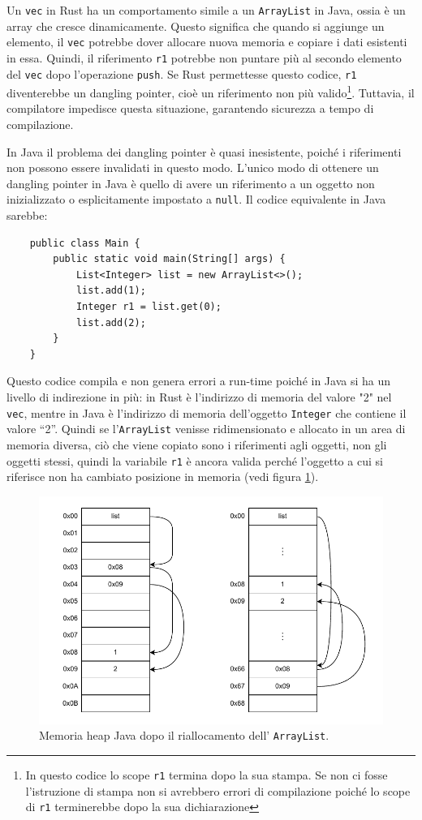 Un \texttt{vec} in Rust ha un comportamento simile a un \texttt{ArrayList} in Java, ossia è un array che cresce dinamicamente. Questo significa che quando si aggiunge un elemento, il \texttt{vec} potrebbe dover allocare nuova memoria e copiare i dati esistenti in essa. Quindi, il riferimento \texttt{r1} potrebbe non puntare più al secondo elemento del \texttt{vec} dopo l'operazione \texttt{push}. Se Rust permettesse questo codice, \texttt{r1} diventerebbe un dangling pointer, cioè un riferimento non più valido\footnote{In questo codice lo scope \texttt{r1} termina dopo la sua stampa. Se non ci fosse l'istruzione di stampa non si avrebbero errori di compilazione poiché lo scope di \texttt{r1} terminerebbe dopo la sua dichiarazione}.
 Tuttavia, il compilatore impedisce questa situazione, garantendo sicurezza a tempo di compilazione.

In Java il problema dei dangling pointer è quasi inesistente, poiché i riferimenti non possono essere invalidati in questo modo. L'unico modo di ottenere un dangling pointer in Java è quello di avere un riferimento a un oggetto non inizializzato o esplicitamente impostato a \texttt{null}. Il codice equivalente in Java sarebbe:
\begin{verbatim}
    public class Main {
        public static void main(String[] args) {
            List<Integer> list = new ArrayList<>();
            list.add(1);
            Integer r1 = list.get(0);
            list.add(2);
        }
    }
\end{verbatim}
Questo codice compila e non genera errori a run-time poiché in Java si ha un livello di indirezione in più:  in Rust è l'indirizzo di memoria del valore "2" nel \texttt{vec}, mentre in Java è l'indirizzo di memoria dell'oggetto \texttt{Integer} che contiene il valore ``2''. Quindi se l'\texttt{ArrayList} venisse ridimensionato e allocato in un area di memoria diversa, ciò che viene copiato sono i riferimenti agli oggetti, non gli oggetti stessi, quindi la variabile \texttt{r1} è ancora valida perché l'oggetto a cui si riferisce non ha cambiato posizione in memoria (vedi figura \ref{fig:bor3}). 
\begin{figure}[H]
    \centering
    \includegraphics[width = \textwidth]{Figures/bor3.drawio.pdf}
    \caption{Memoria heap Java dopo il riallocamento dell' \texttt{ArrayList}.}
    \label{fig:bor3}
\end{figure}
